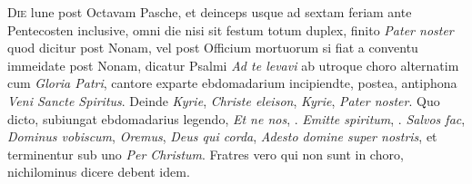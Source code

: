 \begin{multicols*}{2}



{\color{Red} }
\lettrine[lines=2]{\zallmancaps \color{Red} D}{ie} lune post Octavam Pasche, et deinceps usque ad sextam feriam ante Pentecosten inclusive, omni die nisi sit festum totum duplex, finito \textit{Pater noster} quod dicitur post Nonam, vel post Officium mortuorum si fiat a conventu immeidate post Nonam, dicatur Psalmi \textit{Ad te levavi} ab utroque choro alternatim cum \textit{Gloria Patri}, cantore exparte ebdomadarium incipiendte, postea, antiphona \textit{Veni Sancte Spiritus}. Deinde \textit{Kyrie}, \textit{Christe eleison}, \textit{Kyrie}, \textit{Pater noster}. Quo dicto, subiungat ebdomadarius legendo, \textit{Et ne nos}, \Vbar . \textit{Emitte spiritum}, \Vbar . \textit{Salvos fac}, \textit{Dominus vobiscum}, \textit{Oremus}, \textit{Deus qui corda}, \textit{Adesto domine super nostris}, et terminentur sub uno \textit{Per Christum}. Fratres vero qui non sunt in choro, nichilominus dicere debent idem.






\end{multicols*}
